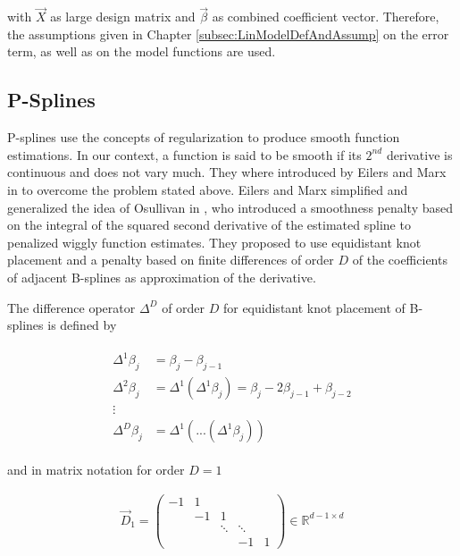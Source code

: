 \documentclass[10pt,a4paper]{report}
\begin{document}
with $\vec{X}$ as large design matrix and $\vec{\beta}$ as combined coefficient vector. Therefore, the assumptions given in Chapter \ref{subsec:LinModelDefAndAssump} on the error term, as well as on the model functions are used. \cite{fahrmeir2004penalized}

\subsection{P-Splines} \label{subsec:p-splines}

P-splines use the concepts of regularization to produce smooth function estimations. In our context, a function is said to be smooth if its $2^{nd}$ derivative is continuous and does not vary much. They where introduced by Eilers and Marx in \cite{eilers1996flexible} to overcome the problem stated above. Eilers and Marx simplified and generalized the idea of Osullivan in \cite{osullivan1986penalties}, who introduced a smoothness penalty based on the integral of the squared second derivative of the estimated spline to penalized wiggly function estimates. They proposed to use equidistant knot placement and a penalty based on finite differences of order $D$ of the coefficients of adjacent B-splines as approximation of the derivative.

The difference operator  $\Delta^D$ of order $D$ for equidistant knot placement of B-splines is defined by

\begin{align} \label{eq:difference-operators}
	\begin{split}
		\Delta^1 \beta_j &= \beta_j - \beta_{j-1} \\
		\Delta^2 \beta_j &= \Delta^1(\Delta^1 \beta_j) = \beta_j - 2\beta_{j-1} + \beta_{j-2} \\ 
		\vdots \\ 
		\Delta^D \beta_j &= \Delta^1(...(\Delta^1 \beta_j))
	\end{split}
\end{align}

and in matrix notation for order $D=1$

\begin{align} \label{eq:d1-difference-matrix}
	\vec{D}_1 = 
	\begin{pmatrix} 
		-1& 1&       &        &   \\  
		&-1& 1     &        &   \\  
		&  &\ddots & \ddots &   \\ 
		&  &       & -1     & 1 
	\end{pmatrix} \in \mathbb R^{d-1\times d}
\end{align}
\end{document}
